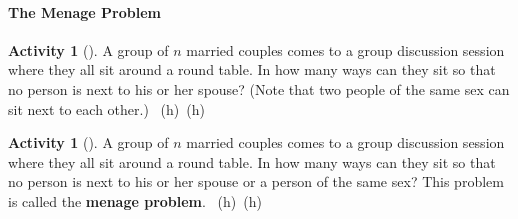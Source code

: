 \documentclass[10pt,]{book}
\newcommand{\terminology}[1]{\textbf{#1}}
\theoremstyle{plain}
\theoremstyle{definition}
\theoremstyle{definition}
\theoremstyle{definition}
\newtheorem{activity}[project]{Activity}
\numberwithin{equation}{chapter}
\begin{document}
\paragraph[{The Menage Problem}]{The Menage Problem}\hypertarget{sec-menage}{}
\begin{activity}[]\label{relaxedmenage}
\hypertarget{p-1208}{}%
A group of \(n\) married couples comes to a group discussion session where they all sit around a round table. In how many ways can they sit so that no person is next to his or her spouse? (Note that two people of the same sex can sit next to each other.)%
~{\tiny (h)}~{\tiny (h)}\end{activity}
\begin{activity}[]\label{activity-220}
\hypertarget{p-1212}{}%
A group of \(n\) married couples comes to a group discussion session where they all sit around a round table. In how many ways can they sit so that no person is next to his or her spouse or a person of the same sex? This problem is called the \terminology{menage problem}.%
~{\tiny (h)}~{\tiny (h)}\end{activity}
\typeout{************************************************}
\typeout{************************************************}
\end{document}
